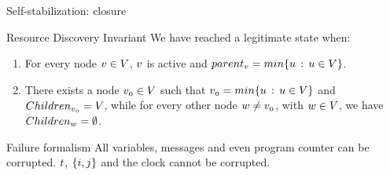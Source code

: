 \documentclass[10pt, compress]{beamer}
\begin{document}

\begin{frame}{Self-stabilization: closure}

\begin{block}{Resource Discovery Invariant}
We have reached a legitimate state when:
\begin{enumerate}
\item For every node $\mathnormal{v \in V}$, $\mathnormal{v}$ is active and $\mathnormal{parent_v = min\{u\,:\, u \in V\}}$.
\item There exists a node $\mathnormal{v_0 \in V}$ such that $\mathnormal{v_0 = min\{u\,:\, u \in V\}}$ and $\mathnormal{Children_{v_0} = V}$, while for every other node $\mathnormal{w \neq v_0}$, with $\mathnormal{w \in V}$, we have $\mathnormal{Children_w = \emptyset}$.
\end{enumerate}
\end{block}

\begin{block}{Failure formalism}
All variables, messages and even program counter can be corrupted. $\mathnormal{t}$, $\mathnormal{\{i, j\}}$ and the clock cannot be corrupted.
\end{block}

\end{frame}

\end{document}
